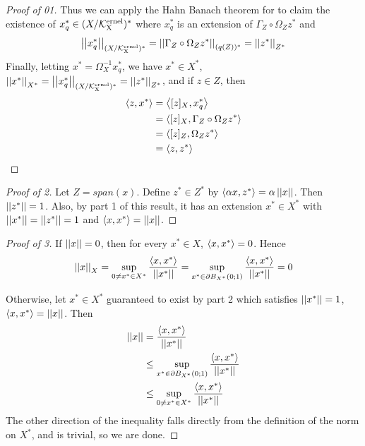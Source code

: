 \begin{thm}
\begin{proof}[Proof of 01]
    Thus we can apply the Hahn Banach theorem for \NormedSpaces to claim 
    the existence of $x_q^* \in (X/\bf\mathcal{K}\rm^{ernel}_X)^*$ where
    $x_q^*$ is an extension of $\Gamma_Z \circ \Omega_Z z^*$ and
    \begin{equation}
        \left|\left| x_q^* \right|\right|_{(X/\bf\mathcal{K}\rm^{ernel}_X)^*} = \left|\left| \Gamma_Z \circ \Omega_Z z^* \right|\right|_{(q(Z))^*} = \left|\left| z^* \right|\right|_{Z^*}
    \end{equation}
    Finally, letting $x^* = \Omega_X^{-1} x_q^*$, we have 
    $x^* \in X^*$, 
    $\left|\left| x^* \right|\right|_{X^*} = \left|\left| x_q^* \right|\right|_{(X/\bf\mathcal{K}\rm^{ernel}_X)^*} =\left|\left| z^* \right|\right|_{Z^*}$, 
    and 
    if $z \in Z$, then 
    \begin{align*}
        \left\langle z, x^* \right\rangle & = \left\langle [z]_X, x_q^* \right\rangle \\
        & = \left\langle [z]_X, \Gamma_Z \circ \Omega_Zz^* \right\rangle\\
        & = \left\langle [z]_Z, \Omega_Z z^* \right\rangle\\
        & = \left\langle z, z^* \right\rangle
    \end{align*}
\end{proof}

\begin{proof}[Proof of 2]
    Let $Z=span(x)$. 
    Define $z^* \in Z^*$ by 
    $\left\langle \alpha x, z^* \right\rangle = \alpha \left|\left| x \right|\right|$. 
    Then $\left|\left| z^* \right|\right| = 1$. 
    Also, by part 1 of this result, 
    it has an extension $x^* \in X^*$ with 
    $\left|\left| x^* \right|\right| = \left|\left| z^* \right|\right| =1$ 
    and $\left\langle x,x^* \right\rangle = \left|\left| x \right|\right|$. 
\end{proof}
\begin{proof}[Proof of 3]
    If $\left|\left| x \right|\right| = 0$, then
    for every $x^* \in X$, $\left\langle x,x^* \right\rangle = 0$.
    Hence 
    \begin{equation} 
    \left|\left| x \right|\right|_X = \sup\limits_{0 \neq x^* \in X^*} \frac{\left\langle x,x^* \right\rangle}{\left|\left| x^* \right|\right|} = \sup\limits_{x^* \in \partial B_{X^*}(0;1)} \frac{\left\langle x,x^* \right\rangle}{\left|\left| x^* \right|\right|}=0
    \end{equation}

    Otherwise, let  $x^* \in X^*$ guaranteed to 
    exist by part 2 which satisfies $\left|\left| x^* \right|\right|=1$, 
    $\left\langle x,x^* \right\rangle = \left|\left| x \right|\right|$. 
    Then 
    \begin{align*}
    \left|\left| x \right|\right| & = \frac{\left\langle x,x^* \right\rangle}{\left|\left| x^* \right|\right|} \\
    & \leq \sup\limits_{x^* \in \partial B_{X^*}(0;1)} \frac{\left\langle x,x^* \right\rangle}{\left|\left| x^* \right|\right|} \\
    & \leq    \sup\limits_{0 \neq x^* \in X^*} \frac{\left\langle x,x^* \right\rangle}{\left|\left| x^* \right|\right|} 
    \end{align*}
    The other direction of the inequality
    falls directly from the definition of 
    the norm on $X^*$, and is trivial, so 
    we are done. 
\end{proof}
\end{thm}

